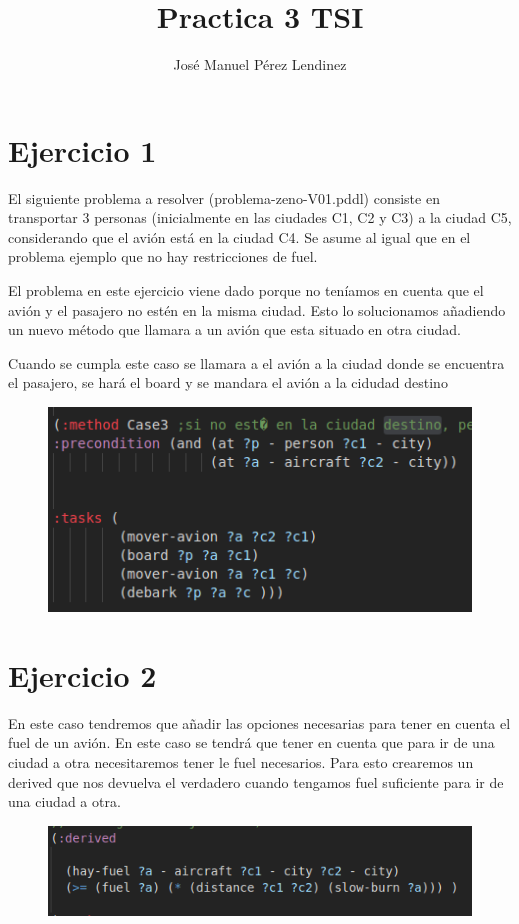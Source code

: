 \documentclass[]{article}
\title{Practica 3 TSI}
\author{José Manuel Pérez Lendinez}
\begin{document}
\maketitle


\newpage
\tableofcontents
\newpage
\section{Ejercicio 1}
El siguiente problema a resolver (problema-zeno-V01.pddl) consiste en transportar 3 personas (inicialmente en las ciudades C1, C2 y C3) a la ciudad C5, considerando que el avión está en la ciudad C4.
Se asume al igual que en el problema ejemplo que no hay restricciones de fuel.

El problema en este ejercicio viene dado porque no teníamos en cuenta que el avión y el pasajero no estén en la misma ciudad. Esto lo solucionamos añadiendo un nuevo método que llamara a un avión que esta situado en otra ciudad. 

Cuando se cumpla este caso se llamara a el avión a la ciudad donde se encuentra el pasajero, se hará el board y se mandara el avión a la cidudad destino
\begin{figure}[H]
	\centering
	\includegraphics[width=0.7\linewidth]{screenshot002}
	\caption{}
	\label{fig:screenshot002}
\end{figure}

\section{Ejercicio 2}
En este caso tendremos que añadir las opciones necesarias para tener en cuenta el fuel de un avión. En este caso se tendrá que tener en cuenta que para ir de una ciudad a otra necesitaremos tener le fuel necesarios. Para esto crearemos un derived que nos devuelva el verdadero cuando tengamos fuel suficiente para ir de una ciudad a otra.
\begin{figure}[H]
	\centering
	\includegraphics[width=0.7\linewidth]{screenshot003}
	\caption{}
	\label{fig:screenshot003}
\end{figure}
\end{document}
